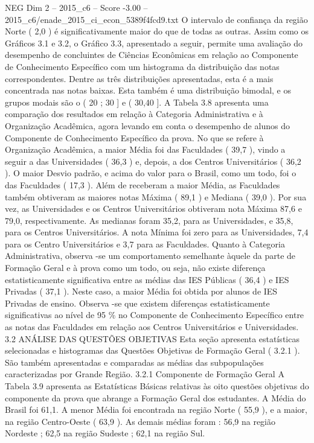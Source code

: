\begin{textsample}{NEG Dim 2 – 2015\_c6 – Score -3.00 – 2015\_c6/enade\_2015\_ci\_econ\_5389f4fcd9.txt}
O intervalo de confiança da região Norte ( 2,0 ) é significativamente maior do que de todas as outras.
Assim como os Gráficos 3.1 e 3.2, o Gráfico 3.3, apresentado a seguir, permite uma avaliação do desempenho de concluintes de Ciências Econômicas em relação ao Componente de Conhecimento Específico com um histograma da distribuição das notas correspondentes.
Dentre as três distribuições apresentadas, esta é a mais concentrada nas notas baixas.
Esta também é uma distribuição bimodal, e os grupos modais são o ( 20 ; 30 ] e ( 30,40 ].
A Tabela 3.8 apresenta uma comparação dos resultados em relação à Categoria Administrativa e à Organização Acadêmica, agora levando em conta o desempenho de alunos do Componente de Conhecimento Específico da prova.
No que se refere à Organização Acadêmica, a maior Média foi das Faculdades ( 39,7 ), vindo a seguir a das Universidades ( 36,3 ) e, depois, a dos Centros Universitários ( 36,2 ).
O maior Desvio padrão, e acima do valor para o Brasil, como um todo, foi o das Faculdades ( 17,3 ).
Além de receberam a maior Média, as Faculdades também obtiveram as maiores notas Máxima ( 89,1 ) e Mediana ( 39,0 ).
Por sua vez, as Universidades e os Centros Universitários obtiveram nota Máxima 87,6 e 79,0, respectivamente.
As medianas foram 35,2, para as Universidades, e 35,8, para os Centros Universitários.
A nota Mínima foi zero para as Universidades, 7,4 para os Centro Universitários e 3,7 para as Faculdades.
Quanto à Categoria Administrativa, observa -se um comportamento semelhante àquele da parte de Formação Geral e à prova como um todo, ou seja, não existe diferença estatisticamente significativa entre as médias das IES Públicas ( 36,4 ) e IES Privadas ( 37,1 ).
Neste caso, a maior Média foi obtida por alunos de IES Privadas de ensino.
Observa -se que existem diferenças estatisticamente significativas ao nível de 95 \% no Componente de Conhecimento Específico entre as notas das Faculdades em relação aos Centros Universitários e Universidades. 3.2 ANÁLISE DAS QUESTÕES OBJETIVAS Esta seção apresenta estatísticas selecionadas e histogramas das Questões Objetivas de Formação Geral ( 3.2.1 ).
São também apresentadas e comparadas as médias das subpopulações caracterizadas por Grande Região. 3.2.1 Componente de Formação Geral A Tabela 3.9 apresenta as Estatísticas Básicas relativas às oito questões objetivas do componente da prova que abrange a Formação Geral dos estudantes.
A Média do Brasil foi 61,1.
A menor Média foi encontrada na região Norte ( 55,9 ), e a maior, na região Centro-Oeste ( 63,9 ).
As demais médias foram : 56,9 na região Nordeste ; 62,5 na região Sudeste ; 62,1 na região Sul.

\end{textsample}
